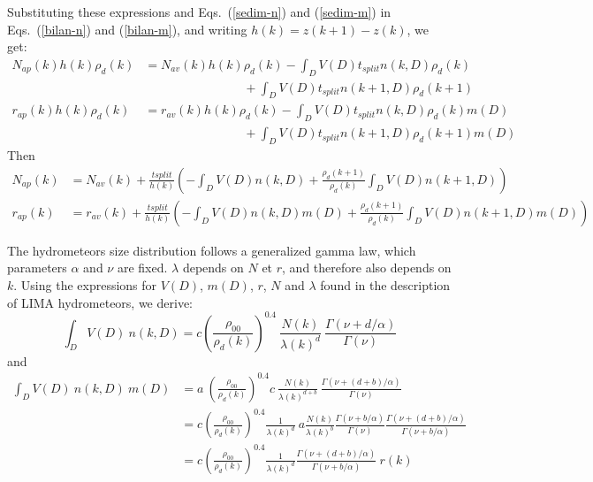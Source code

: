 {Substituting these expressions and Eqs.\ (\ref{sedim-n}) and (\ref{sedim-m}) in Eqs.\ (\ref{bilan-n}) and (\ref{bilan-m}), and writing $h(k)=z(k+1)-z(k)$, we get:
\begin{align}
 N_{ap}(k) h(k) \rho_d(k) &= N_{av}(k) h(k) \rho_d(k) %
          - \int_D V(D)t_{split}n(k,D)\rho_d(k) \nonumber \\
          & \qquad \qquad \qquad \qquad + \int_D V(D)t_{split}n(k+1,D)\rho_d(k+1)  \\
 r_{ap}(k) h(k) \rho_d(k) &= r_{av}(k) h(k) \rho_d(k) %
          - \int_D V(D)t_{split}n(k,D)\rho_d(k)m(D) \nonumber \\
          & \qquad \qquad \qquad \qquad + \int_D V(D)t_{split}n(k+1,D)\rho_d(k+1)m(D)
\end{align}
Then
\begin{align}
 \label{evol-N}
 N_{ap}(k)&= N_{av}(k) + \frac{tsplit}{h(k)} \left( %
          - \int_D V(D)n(k,D) %
          + \frac{\rho_d(k+1)}{\rho_d(k)} \int_D V(D)n(k+1,D) \right)  \\
 \label{evol-r}
 r_{ap}(k) &= r_{av}(k)  + \frac{tsplit}{h(k)} \left( %
          - \int_D V(D)n(k,D)m(D) %
          + \frac{\rho_d(k+1)}{\rho_d(k)} \int_D V(D)n(k+1,D)m(D) \right)
\end{align}

The hydrometeors size distribution follows a generalized gamma law, which parameters $\alpha$ and $\nu$ are fixed. $\lambda$ depends on $N$ et $r$, and therefore also depends on $k$. Using the expressions for $V(D)$, $m(D)$, $r$, $N$ and $\lambda$ found in the description of LIMA hydrometeors, we derive:
\begin{equation}
 \int_D V(D)~n(k,D) = c \left(\frac{\rho_{00}}{\rho_d(k)}\right)^{0.4} ~ \frac{N(k)}{\lambda(k)^d}  ~ \frac{\Gamma(\nu+d/\alpha)}{\Gamma(\nu)}
\end{equation}
and
\begin{align}
 \int_D V(D)~n(k,D)~m(D) &= a~\left(\frac{\rho_{00}}{\rho_d(k)}\right)^{0.4} c~\frac{N(k)}{\lambda(k)^{d+b}}~\frac{\Gamma(\nu+(d+b)/\alpha)}{\Gamma(\nu)}   \\
 &= c \left(\frac{\rho_{00}}{\rho_d(k)}\right)^{0.4} \frac{1}{\lambda(k)^d} ~ a \frac{N(k)}{\lambda(k)^b} \frac{\Gamma(\nu+b/\alpha)}{\Gamma(\nu)} \frac{\Gamma(\nu+(d+b)/\alpha)}{\Gamma(\nu+b/\alpha)} \\
 \label{integ-Vnm}
 &= c \left(\frac{\rho_{00}}{\rho_d(k)}\right)^{0.4} \frac{1}{\lambda(k)^d} \frac{\Gamma(\nu+(d+b)/\alpha)}{\Gamma(\nu+b/\alpha)} ~ r(k)
\end{align}

}
